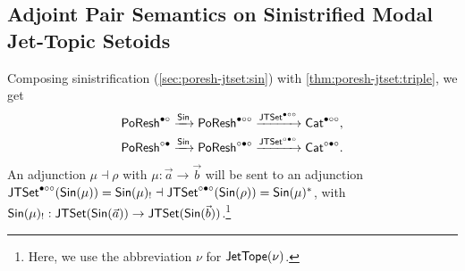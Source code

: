 \documentclass[a4paper]{memoir}
\begin{document}
{%

\subsection{Adjoint Pair Semantics on Sinistrified Modal Jet-Topic Setoids} \label{sec:poresh-jtset:pair-sin}
Composing sinistrification (\cref{sec:poresh-jtset:sin}) with \ref{thm:poresh-jtset:triple}, we get
\begin{align*}
	&\mathsf{PoResh}^{\bullet \circ} \xrightarrow{{\mathsf{Sin}}} \mathsf{PoResh}^{\bullet \circ \circ} \xrightarrow{\mathsf{JTSet}^{\bullet \circ \circ}} {\mathsf{Cat}}^{\bullet \circ \circ}, \\
	&\mathsf{PoResh}^{\circ \bullet} \xrightarrow{{\mathsf{Sin}}} \mathsf{PoResh}^{\circ \bullet \circ} \xrightarrow{\mathsf{JTSet}^{\circ \bullet \circ}} {\mathsf{Cat}}^{\circ \bullet \circ}.
\end{align*}
An adjunction $\mu \dashv \rho$ with $\mu : \vec a \to \vec b$ will be sent to an adjunction $\mathsf{JTSet}^{\bullet \circ \circ}({\mathsf{Sin}}(\mu)) = {\mathsf{Sin}}(\mu)_! \dashv \mathsf{JTSet}^{\circ \bullet \circ}({\mathsf{Sin}}(\rho)) = {\mathsf{Sin}}(\mu)^*$, with ${\mathsf{Sin}}(\mu)_! : \mathsf{JTSet}({\mathsf{Sin}}(\vec a)) \to \mathsf{JTSet}({\mathsf{Sin}}(\vec b))$.\footnote{Here, we use the abbreviation $\nu$ for $\mathsf{JetTope}(\nu)$.}

}
\end{document}
